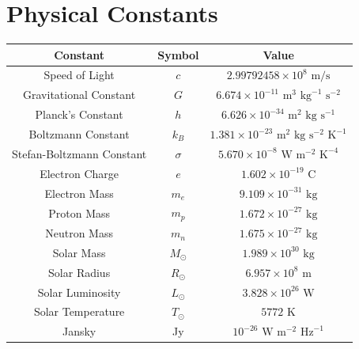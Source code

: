 \chapter*{Physical Constants}

\vspace*{\fill}
\begin{table}[h]
        \centering
        \begin{tabular}{|c|c|c|}
                \hline
                Constant & Symbol & Value \\
                \hline
                Speed of Light & $c$ & $2.99792458 \times 10^8 \text{ m/s}$ \\
                Gravitational Constant & $G$ & $6.674 \times 10^{-11} \text{ m}^3 \text{ kg}^{-1} \text{ s}^{-2}$ \\
                Planck's Constant & $h$ & $6.626 \times 10^{-34} \text{ m}^2 \text{ kg} \text{ s}^{-1}$ \\
                Boltzmann Constant & $k_B$ & $1.381 \times 10^{-23} \text{ m}^2 \text{ kg} \text{ s}^{-2} \text{ K}^{-1}$ \\
                Stefan-Boltzmann Constant & $\sigma$ & $5.670 \times 10^{-8} \text{ W} \text{ m}^{-2} \text{ K}^{-4}$ \\
                Electron Charge & $e$ & $1.602 \times 10^{-19} \text{ C}$ \\
                Electron Mass & $m_e$ & $9.109 \times 10^{-31} \text{ kg}$ \\
                Proton Mass & $m_p$ & $1.672 \times 10^{-27} \text{ kg}$ \\
                Neutron Mass & $m_n$ & $1.675 \times 10^{-27} \text{ kg}$ \\
                Solar Mass & $M_\odot$ & $1.989 \times 10^{30} \text{ kg}$ \\
                Solar Radius & $R_\odot$ & $6.957 \times 10^8 \text{ m}$ \\
                Solar Luminosity & $L_\odot$ & $3.828 \times 10^{26} \text{ W}$ \\
                Solar Temperature & $T_\odot$ & $5772 \text{ K}$ \\
                Jansky & Jy & $10^{-26} \text{ W} \text{ m}^{-2} \text{ Hz}^{-1}$ \\
                \hline
        \end{tabular}
\end{table}
\vspace*{\fill}